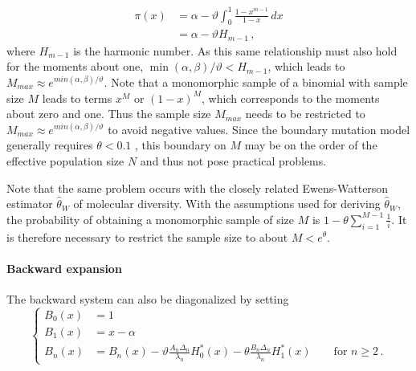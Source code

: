 \documentclass[preprint]{elsarticle}
\begin{document}
\begin{equation}
\begin{split}
    \pi(x) &= \alpha -\vartheta\int_0^1 \frac{1-x^{m-1}}{1-x}\,dx\\
    &=\alpha-\vartheta H_{m-1}\,,
\end{split}
\end{equation}
where $H_{m-1}$ is the harmonic number. As this same relationship must also hold for the moments about one, $\min(\alpha,\beta)/\vartheta< H_{m-1}$, which leads to $M_{max}\approx e^{min(\alpha,\beta)/\vartheta}$.
Note that a monomorphic sample of a binomial with sample size $M$ leads to terms $x^M$ or $(1-x)^M$, which corresponds to the moments about zero and one. Thus the sample size $M_{max}$ needs to be restricted to $M_{max}\approx e^{min(\alpha,\beta)/\vartheta}$ to avoid negative values. Since the boundary mutation model generally requires $\theta<0.1$ \citep{Vogl15}, this boundary on $M$ may be on the order of the effective population size $N$ and thus not pose practical problems. 

Note that the same problem occurs with the closely related Ewens-Watterson estimator $\hat \theta_W$ of molecular diversity. With the assumptions used for deriving $\hat \theta_W$, the probability of obtaining a monomorphic sample of size $M$ is $1-\theta\sum_{i=1}^{M-1} \frac{1}{i}$. It is therefore necessary to restrict the sample size to about $M<e^\theta$. 

\paragraph{Backward expansion} The backward system can also be diagonalized by setting
\begin{equation}\label{eq:backw_bound_diag}
\begin{cases}
    B_0(x)&=1\\
    B_1(x)&=x-\alpha\\
    B_n(x)&=B_n(x)-\vartheta \frac{A_n\Delta_n}{\lambda_n} H_0^{*}(x)-\theta \frac{B_n\Delta_n}{\lambda_n} H_1^{*}(x)\qquad\text{for $n\geq 2$}\,.
\end{cases}
\end{equation}


\end{document}

